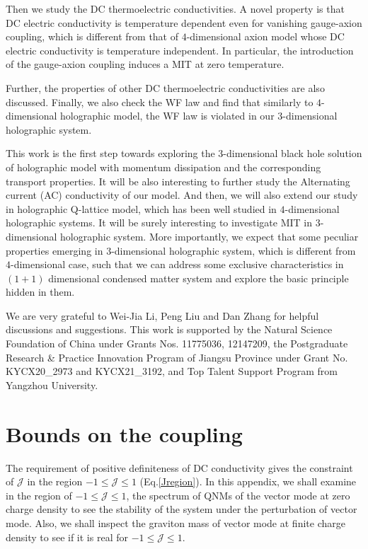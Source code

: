 \documentclass[preprint,onecolumn,nofootinbib]{revtex4}
\begin{document}
Then we study the DC thermoelectric conductivities. A novel property is that DC electric conductivity is temperature dependent even for vanishing gauge-axion coupling, which is different from that of $4$-dimensional axion model whose DC electric conductivity is temperature independent.
In particular, the introduction of the gauge-axion coupling induces a MIT at zero temperature.

Further, the properties of other DC thermoelectric conductivities are also discussed. Finally, we also check the WF law and find that similarly to $4$-dimensional holographic model, the WF law is violated in our $3$-dimensional holographic system.

This work is the first step towards exploring the $3$-dimensional black hole solution of holographic model with momentum dissipation and the corresponding transport properties. It will be also interesting to further study the Alternating current (AC) conductivity of our model. And then, we will also extend our study in holographic Q-lattice model, which has been well studied in $4$-dimensional holographic systems. It will be surely interesting to investigate MIT in $3$-dimensional holographic system.
More importantly, we expect that some peculiar properties emerging in $3$-dimensional holographic system, which is different from $4$-dimensional case, such that we can address some exclusive characteristics in $(1+1)$ dimensional condensed matter system and explore the basic principle hidden in them.


\begin{acknowledgments}
	
We are very grateful to Wei-Jia Li, Peng Liu and Dan Zhang for helpful discussions and suggestions. This work is supported by the Natural Science Foundation of China under Grants Nos. 11775036, 12147209, the Postgraduate Research \& Practice Innovation Program of Jiangsu Province under Grant No. KYCX20\_2973 and KYCX21\_3192, and Top Talent Support Program from Yangzhou University.
\end{acknowledgments}

\appendix
\section{Bounds on the coupling}\label{appendix-A}

The requirement of positive definiteness of DC conductivity gives the constraint of $\mathcal{J}$ in the region $-1\leq\mathcal{J}\leq 1$ (Eq.\eqref{Jregion}). In this appendix, we shall examine in the region of $-1\leq\mathcal{J}\leq 1$, the spectrum of QNMs of the vector mode at zero charge density to see the stability of the system under the perturbation of vector mode. Also, we shall inspect the graviton mass of vector mode at finite charge density to see if it is real for $-1\leq\mathcal{J}\leq 1$.
\end{document}
